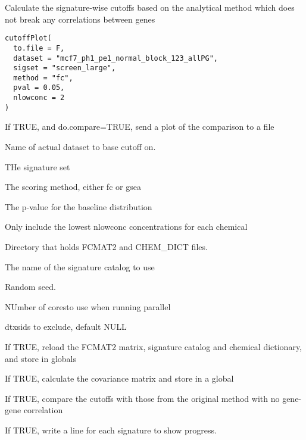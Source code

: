 \documentclass[letterpaper]{book}
\begin{document}
%
\begin{Description}\relax
Calculate the signature-wise cutoffs based on the analytical method
which does not break any correlations between genes
\end{Description}
%
\begin{Usage}
\begin{verbatim}
cutoffPlot(
  to.file = F,
  dataset = "mcf7_ph1_pe1_normal_block_123_allPG",
  sigset = "screen_large",
  method = "fc",
  pval = 0.05,
  nlowconc = 2
)
\end{verbatim}
\end{Usage}
%
\begin{Arguments}
\begin{ldescription}
\item[\code{to.file}] If TRUE, and do.compare=TRUE, send a plot of the comparison to a file

\item[\code{dataset}] Name of actual dataset to base cutoff on.

\item[\code{sigset}] THe signature set

\item[\code{method}] The scoring method, either fc or gsea

\item[\code{pval}] The p-value for the baseline distribution

\item[\code{nlowconc}] Only include the lowest nlowconc concentrations for each chemical

\item[\code{basedir}] Directory that holds FCMAT2 and CHEM\_DICT files.

\item[\code{sigcatalog}] The name of the signature catalog to use

\item[\code{seed}] Random seed.

\item[\code{mc.cores}] NUmber of coresto use when running parallel

\item[\code{dtxsid.exclude}] dtxsids to exclude, default NULL

\item[\code{do.load}] If TRUE, reload the FCMAT2 matrix, signature catalog and chemical dictionary, and store in globals

\item[\code{do.cov}] If TRUE, calculate the covariance matrix and store in a global

\item[\code{do.compare}] If TRUE, compare the cutoffs with those from the original method with no gene-gene correlation

\item[\code{verbose}] If TRUE, write a line for each signature to show progress.
\end{ldescription}
\end{Arguments}
\end{document}
